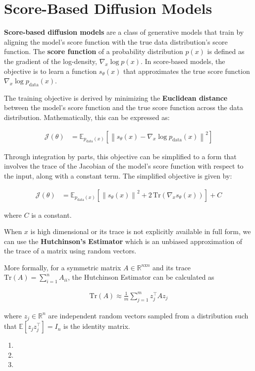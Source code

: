 \section{Score-Based Diffusion Models}

\textbf{Score-based diffusion models} are a class of generative models that train by aligning the model's score function with the true data 
distribution's score function. The \textbf{score function} of a probability distribution $p(x)$ is defined as the gradient of the log-density, 
$\nabla_x \log p(x)$. In score-based models, the objective is to learn a function $s_\theta(x)$ that approximates the true score function
$\nabla_x \log p_{\text{data}}(x)$.

The training objective is derived by minimizing the \textbf{Euclidean distance} between the model's score function and the true score function across the 
data distribution. Mathematically, this can be expressed as:

\begin{align}
    \mathcal{J}(\theta) &= \mathbb{E}_{p_{\text{data}}(x)} \left[ \left\| s_\theta(x) - \nabla_x \log p_{\text{data}}(x) \right\|^2 \right]
\end{align}

Through integration by parts, this objective can be simplified to a form that involves the trace of the Jacobian of the model's score function with 
respect to the input, along with a constant term. The simplified objective is given by:

\begin{align}
    \mathcal{J}(\theta) &= \mathbb{E}_{p_{\text{data}}(x)} \left[ \left\| s_\theta(x) \right\|^2 + 2 \, \text{Tr} \left( \nabla_x s_\theta(x) \right) \right] + C
\end{align}

where $C$ is a constant.

When $x$ is high dimensional or its trace is not explicitly available in full form, we can use the \textbf{Hutchinson's Estimator} which is an unbiased 
approximation of the trace of a matrix using random vectors. 

More formally, for a symmetric matrix $A \in \mathbb{R}^{n \text{x} n}$ and its trace $\text{Tr}(A) = \sum_{i=1}^{n} A_{ii}$, the Hutchinson Estimator 
can be calculated as

\begin{align}
    \text{Tr}(A) \approx \frac{1}{m} \sum_{j=1}^{m} z_{j}^{\top} Az_j
\end{align}

where $z_j \in \mathbb{R}^n$ are independent random vectors sampled from a distribution such that $\mathbb{E}[z_jz_j^\top] = I_n$ is the identity  matrix.

\begin{enumerate}[label=(\alph*)]
    \item 

    \item 

    \item 
\end{enumerate}